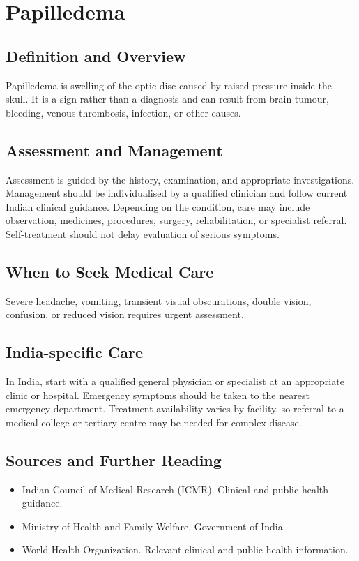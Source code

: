 \chapter{Papilledema}

\section*{Definition and Overview}
Papilledema is swelling of the optic disc caused by raised pressure inside the skull. It is a sign rather than a diagnosis and can result from brain tumour, bleeding, venous thrombosis, infection, or other causes.

\section*{Assessment and Management}
Assessment is guided by the history, examination, and appropriate investigations. Management should be individualised by a qualified clinician and follow current Indian clinical guidance. Depending on the condition, care may include observation, medicines, procedures, surgery, rehabilitation, or specialist referral. Self-treatment should not delay evaluation of serious symptoms.

\section*{When to Seek Medical Care}
Severe headache, vomiting, transient visual obscurations, double vision, confusion, or reduced vision requires urgent assessment.

\section*{India-specific Care}
In India, start with a qualified general physician or specialist at an appropriate clinic or hospital. Emergency symptoms should be taken to the nearest emergency department. Treatment availability varies by facility, so referral to a medical college or tertiary centre may be needed for complex disease.

\section*{Sources and Further Reading}
\begin{itemize}
    \item Indian Council of Medical Research (ICMR). Clinical and public-health guidance.
    \item Ministry of Health and Family Welfare, Government of India.
    \item World Health Organization. Relevant clinical and public-health information.
\end{itemize}

